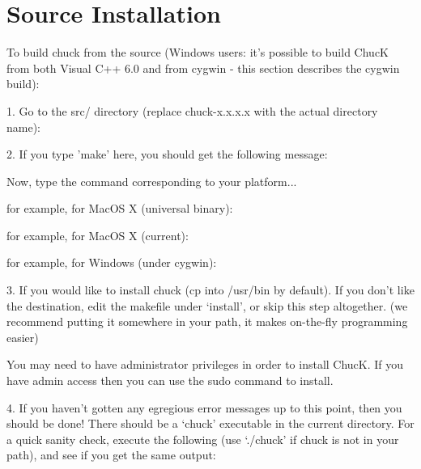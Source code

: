 \section{Source Installation}

To build chuck from the source (Windows users: it's possible to build ChucK
from both Visual C++ 6.0 and from cygwin - this section describes the cygwin
build): 

1. Go to the src/ directory (replace chuck-x.x.x.x with the actual 
directory name):



2. If you type 'make' here, you should get the following message:


Now, type the command corresponding to your platform... 

for example, for MacOS X (universal binary):


for example, for MacOS X (current):


for example, for Windows (under cygwin):


3. If you would like to install chuck (cp into /usr/bin by default). If you 
don't like the destination, edit the makefile under `install', or 
skip this step altogether. (we recommend putting it somewhere in your 
path, it makes on-the-fly programming easier)


You may need to have administrator privileges in order to install ChucK. If you 
have admin access then you can use the sudo command to install.


4. If you haven't gotten any egregious error messages up to this point, 
then you should be done! There should be a `chuck' executable in the 
current directory. For a quick sanity check, execute the following (use 
`./chuck' if chuck is not in your path), and see if you get the same output:


